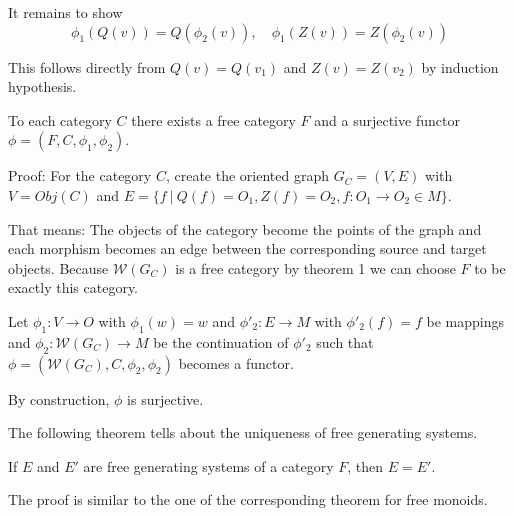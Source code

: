 It remains to show \[ \phi_1(Q(v)) = Q(\phi_2(v)),\quad \phi_1(Z(v)) =
Z(\phi_2(v)) \]

This follows directly from $Q(v) = Q(v_1)$ and $Z(v) = Z(v_2)$ by induction
hypothesis.

\begin{theorem}
To each category $C$ there exists a free category $F$ and a surjective functor
$\phi = (F, C, \phi_1, \phi_2)$.
\end{theorem}

Proof: For the category $C$, create the oriented graph $G_C = (V, E)$ with $V =
Obj(C)$ and $E = \{ f\ |\ Q(f) = O_1, Z(f) = O_2, f : O_1 \to O_2 \in M \}$.

That means: The objects of the category become the points of the graph and each
morphism becomes an edge between the corresponding source and target objects.
Because $\mathcal{W}(G_C)$ is a free category by theorem 1 we can choose $F$ to
be exactly this category.

Let $\phi_1 : V \to O$ with $\phi_1(w) = w$ and $\phi'_2 : E \to M$ with
$\phi'_2(f) = f$ be mappings and $\phi_2 : \mathcal{W}(G_C) \to M$ be the
continuation of $\phi'_2$ such that $\phi = (\mathcal{W}(G_C), C, \phi_2,
\phi_2)$ becomes a functor.

By construction, $\phi$ is surjective.

The following theorem tells about the uniqueness of free generating systems.

\begin{theorem}
If $E$ and $E'$ are free generating systems of a category $F$, then $E = E'$.
\end{theorem}

The proof is similar to the one of the corresponding theorem for free monoids.
